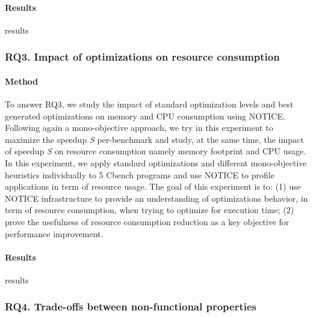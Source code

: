\paragraph{Results}
results

\noindent{}
\subsubsection{RQ3. Impact of optimizations on resource consumption}
\paragraph{Method}
To answer RQ3, we study the impact of standard optimization levels and best generated optimizations on memory and CPU consumption using NOTICE. Following again a mono-objective approach, we try in this experiment to maximize the speedup \textit{S} per-benchmark and study, at the same time, the impact of speedup \textit{S} on resource consumption namely memory footprint and CPU usage. 
In this experiment, we apply standard optimizations and different mono-objective heuristics individually to 5 Cbench programs and use NOTICE to profile applications in term of resource usage.   
The goal of this experiment is to: (1) use NOTICE infrastructure to provide an understanding of optimizations behavior, in term of resource consumption, when trying to optimize for execution time; (2) prove the usefulness of resource consumption reduction as a key objective for performance improvement.




\paragraph{Results}

results

\noindent{}
\subsubsection{RQ4. Trade-offs between non-functional properties}
